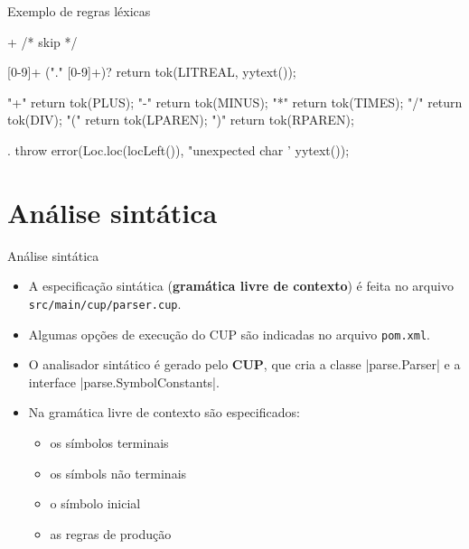 \documentclass[smaller]{beamer}
\begin{document}
\begin{frame}{Exemplo de regras léxicas}
\begin{pygmented}[lang=text]
[ \t\f\n\r]+           { /* skip */ }

[0-9]+ ("." [0-9]+)?   { return tok(LITREAL, yytext()); }

"+"                    { return tok(PLUS); }
"-"                    { return tok(MINUS); }
"*"                    { return tok(TIMES); }
"/"                    { return tok(DIV); }
"("                    { return tok(LPAREN); }
")"                    { return tok(RPAREN); }

.                      { throw error(Loc.loc(locLeft()),
                                     "unexpected char '%
                                     yytext()); }
\end{pygmented}
\end{frame}


\section{Análise sintática}

\begin{frame}{Análise sintática}
  \begin{itemize}
    \item A especificação sintática (\textbf{gramática livre de
      contexto}) é feita no arquivo
    \alert{\texttt{src/main/cup/parser.cup}}.
    \item Algumas opções de execução do CUP são indicadas no arquivo
    \alert{\texttt{pom.xml}}.
    \item O analisador sintático é gerado pelo \textbf{CUP}, que cria
    a classe \pyginline|parse.Parser| e a interface
    \pyginline|parse.SymbolConstants|.
    \item Na gramática livre de contexto são especificados:
    \begin{itemize}
      \item os símbolos terminais
      \item os símbols não terminais
      \item o símbolo inicial
      \item as regras de produção
    \end{itemize}
  \end{itemize}
\end{frame}
\end{document}
